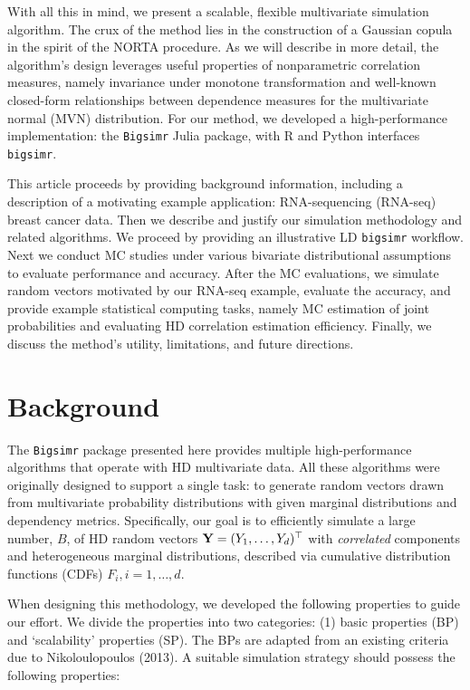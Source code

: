 \documentclass{article}
\begin{document}
With all this in mind, we present a scalable, flexible multivariate
simulation algorithm. The crux of the method lies in the construction of
a Gaussian copula in the spirit of the NORTA procedure. As we will
describe in more detail, the algorithm's design leverages useful
properties of nonparametric correlation measures, namely invariance
under monotone transformation and well-known closed-form relationships
between dependence measures for the multivariate normal (MVN)
distribution. For our method, we developed a high-performance
implementation: the \texttt{Bigsimr} Julia package, with R and Python
interfaces \texttt{bigsimr}.

This article proceeds by providing background information, including a
description of a motivating example application: RNA-sequencing
(RNA-seq) breast cancer data. Then we describe and justify our
simulation methodology and related algorithms. We proceed by providing
an illustrative LD \texttt{bigsimr} workflow. Next we conduct MC studies
under various bivariate distributional assumptions to evaluate
performance and accuracy. After the MC evaluations, we simulate random
vectors motivated by our RNA-seq example, evaluate the accuracy, and
provide example statistical computing tasks, namely MC estimation of
joint probabilities and evaluating HD correlation estimation efficiency.
Finally, we discuss the method's utility, limitations, and future
directions.

\hypertarget{background}{%
\section{Background}\label{background}}

The \texttt{Bigsimr} package presented here provides multiple
high-performance algorithms that operate with HD multivariate data. All
these algorithms were originally designed to support a single task: to
generate random vectors drawn from multivariate probability
distributions with given marginal distributions and dependency metrics.
Specifically, our goal is to efficiently simulate a large number, \(B\),
of HD random vectors \({\bf Y}=(Y_1, \ldots, Y_d)^\top\) with
\emph{correlated} components and heterogeneous marginal distributions,
described via cumulative distribution functions (CDFs)
\(F_i, i=1,\ldots,d\).

When designing this methodology, we developed the following properties
to guide our effort. We divide the properties into two categories: (1)
basic properties (BP) and `scalability' properties (SP). The BPs are
adapted from an existing criteria due to Nikoloulopoulos (2013). A
suitable simulation strategy should possess the following properties:
\end{document}
